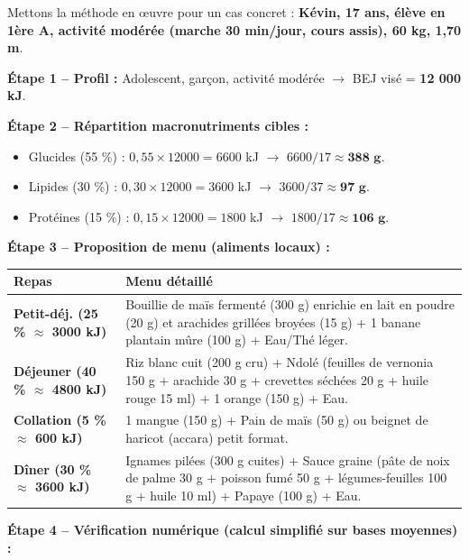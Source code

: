 \documentclass[11pt]{article}
\begin{document}
Mettons la méthode en œuvre pour un cas concret : \textbf{Kévin, 17 ans, élève en 1ère A, activité modérée (marche 30 min/jour, cours assis), 60 kg, 1,70 m}.

\begin{exoresolu}
\textbf{Étape 1 -- Profil :} Adolescent, garçon, activité modérée $\rightarrow$ BEJ visé = \textbf{12 000 kJ}.

\textbf{Étape 2 -- Répartition macronutriments cibles :}
\begin{itemize}
    \item Glucides (55 \%) : $0,55 \times 12000 = 6600$ kJ $\rightarrow$ $6600 / 17 \approx \textbf{388 g}$.
    \item Lipides (30 \%) : $0,30 \times 12000 = 3600$ kJ $\rightarrow$ $3600 / 37 \approx \textbf{97 g}$.
    \item Protéines (15 \%) : $0,15 \times 12000 = 1800$ kJ $\rightarrow$ $1800 / 17 \approx \textbf{106 g}$.
\end{itemize}

\textbf{Étape 3 -- Proposition de menu (aliments locaux) :}

\begin{center}
\begin{tabularx}{\linewidth}{|l|X|}\hline
\textbf{Repas} & \textbf{Menu détaillé} \\ \hline
\textbf{Petit-déj. (25 \% $\approx$ 3000 kJ)} & Bouillie de maïs fermenté (300 g) enrichie en lait en poudre (20 g) et arachides grillées broyées (15 g) + 1 banane plantain mûre (100 g) + Eau/Thé léger. \\ \hline
\textbf{Déjeuner (40 \% $\approx$ 4800 kJ)} & Riz blanc cuit (200 g cru) + Ndolé (feuilles de vernonia 150 g + arachide 30 g + crevettes séchées 20 g + huile rouge 15 ml) + 1 orange (150 g) + Eau. \\ \hline
\textbf{Collation (5 \% $\approx$ 600 kJ)} & 1 mangue (150 g) + Pain de maïs (50 g) ou beignet de haricot (accara) petit format. \\ \hline
\textbf{Dîner (30 \% $\approx$ 3600 kJ)} & Ignames pilées (300 g cuites) + Sauce graine (pâte de noix de palme 30 g + poisson fumé 50 g + légumes-feuilles 100 g + huile 10 ml) + Papaye (100 g) + Eau. \\ \hline
\end{tabularx}
\end{center}

\textbf{Étape 4 -- Vérification numérique (calcul simplifié sur bases moyennes) :}


\end{exoresolu}
\end{document}
